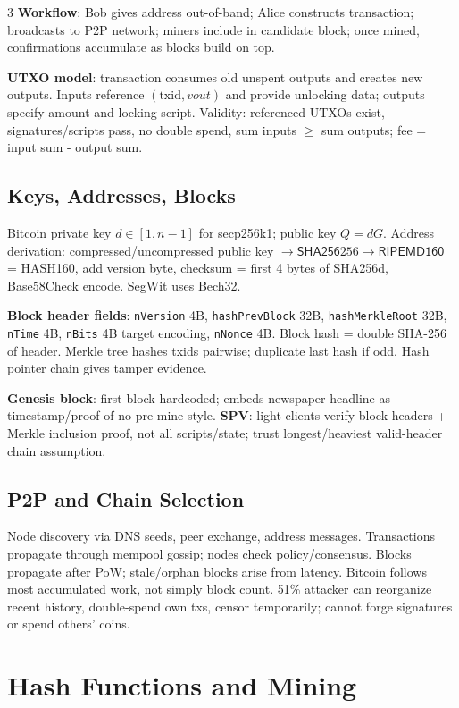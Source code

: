 \documentclass[8pt]{extarticle}
\newcommand{\term}[1]{\textbf{#1}}
\newcommand{\sha}{\mathsf{SHA256}}
\begin{document}
\begin{multicols*}{3}
\term{Workflow}: Bob gives address out-of-band; Alice constructs transaction; broadcasts to P2P network; miners include in candidate block; once mined, confirmations accumulate as blocks build on top.

\term{UTXO model}: transaction consumes old unspent outputs and creates new outputs. Inputs reference $(\mathrm{txid},vout)$ and provide unlocking data; outputs specify amount and locking script. Validity: referenced UTXOs exist, signatures/scripts pass, no double spend, sum inputs $\ge$ sum outputs; fee = input sum - output sum.

\subsection{Keys, Addresses, Blocks}
Bitcoin private key $d\in[1,n-1]$ for secp256k1; public key $Q=dG$. Address derivation: compressed/uncompressed public key $\to \sha256 \to \mathsf{RIPEMD160}$ = HASH160, add version byte, checksum = first 4 bytes of SHA256d, Base58Check encode. SegWit uses Bech32.

\term{Block header fields}: \texttt{nVersion} 4B, \texttt{hashPrevBlock} 32B, \texttt{hashMerkleRoot} 32B, \texttt{nTime} 4B, \texttt{nBits} 4B target encoding, \texttt{nNonce} 4B. Block hash = double SHA-256 of header. Merkle tree hashes txids pairwise; duplicate last hash if odd. Hash pointer chain gives tamper evidence.

\term{Genesis block}: first block hardcoded; embeds newspaper headline as timestamp/proof of no pre-mine style. \term{SPV}: light clients verify block headers + Merkle inclusion proof, not all scripts/state; trust longest/heaviest valid-header chain assumption.

\subsection{P2P and Chain Selection}
Node discovery via DNS seeds, peer exchange, address messages. Transactions propagate through mempool gossip; nodes check policy/consensus. Blocks propagate after PoW; stale/orphan blocks arise from latency. Bitcoin follows most accumulated work, not simply block count. 51\% attacker can reorganize recent history, double-spend own txs, censor temporarily; cannot forge signatures or spend others' coins.

\section{Hash Functions and Mining}

\end{multicols*}
\end{document}
